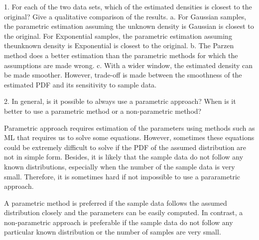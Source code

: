 1. For each of the two data sets, which of the estimated densities is closest to the original? Give a qualitative comparison of the results.
    a. For Gaussian samples, the parametric estimation assuming the unknown density is Gaussian is closest to the original. For Exponential samples, the parametric estimation assuming theunknown density is Exponential is closest to the original.
    b. The Parzen method does a better estimation than the parametric methods for which the assumptions are made wrong.
    c. With a wider window, the estimated density can be made smoother. However, trade-off is made between the smoothness of the estimated PDF and its sensitivity to sample data.

2. In general, is it possible to always use a parametric approach? When is it better to use a parametric method or a non-parametric method?

Parametric approach requires estimation of the parameters using methods such as ML that requires us to solve some equations. However, sometimes these equations could be extremely difficult to solve if the PDF of the assumed distribution are not in simple form. Besides, it is likely that the sample data do not follow any known distributions, especially when the number of the sample data is very small. Therefore, it is sometimes hard if not impossible to use a pararametric approach.

A parametric method is preferred if the sample data follows the assumed distribution closely and the parameters can be easily computed. In contrast, a non-parametric approach is preferable if the sample data do not follow any particular known distribution or the number of samples are very small.
